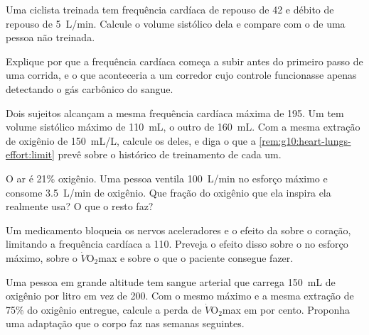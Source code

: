 \begin{exercise}[$\star\star$]\label{exo:g10:heart-lungs-effort:10}
Uma ciclista treinada tem frequência cardíaca de repouso de 42 e débito
de repouso de \qty{5}{L/min}. Calcule o volume sistólico dela e compare
com o de uma pessoa não treinada.
\end{exercise}

\begin{exercise}[$\star\star$]\label{exo:g10:heart-lungs-effort:11}
Explique por que a frequência cardíaca começa a subir antes do primeiro
passo de uma corrida, e o que aconteceria a um corredor cujo controle
funcionasse apenas detectando o gás carbônico do sangue.
\end{exercise}

\begin{exercise}[$\star\star\star$]\label{exo:g10:heart-lungs-effort:12}
Dois sujeitos alcançam a mesma frequência cardíaca máxima de 195. Um
tem volume sistólico máximo de \qty{110}{mL}, o outro de
\qty{160}{mL}. Com a mesma extração de oxigênio de \qty{150}{mL/L},
calcule os  deles, e diga o que a
\cref{rem:g10:heart-lungs-effort:limit} prevê sobre o histórico de
treinamento de cada um.
\end{exercise}

\begin{exercise}[$\star\star\star$]\label{exo:g10:heart-lungs-effort:13}
O ar é 21\% oxigênio. Uma pessoa ventila \qty{100}{L/min} no esforço
máximo e consome \qty{3.5}{L/min} de oxigênio. Que fração do oxigênio
que ela inspira ela realmente usa? O que o resto faz?
\end{exercise}

\begin{exercise}[$\star\star\star$]\label{exo:g10:heart-lungs-effort:14}
Um medicamento bloqueia os nervos aceleradores e o efeito da
 sobre o coração, limitando a frequência cardíaca a 110.
Preveja o efeito disso sobre o  no esforço máximo, sobre
o $\dot V\!\mathrm{O_2}$max e sobre o que o paciente consegue fazer.
\end{exercise}

\begin{exercise}[$\star\star\star$]\label{exo:g10:heart-lungs-effort:15}
Uma pessoa em grande altitude tem sangue arterial que carrega
\qty{150}{mL} de oxigênio por litro em vez de \num{200}. Com o mesmo
 máximo e a mesma extração de 75\% do oxigênio entregue,
calcule a perda de $\dot V\!\mathrm{O_2}$max em por cento. Proponha uma
adaptação que o corpo faz nas semanas seguintes.
\end{exercise}

